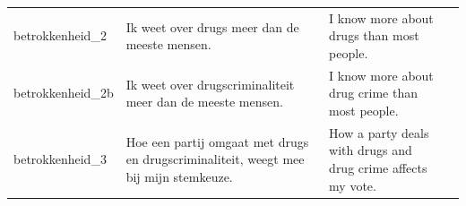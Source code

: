 \begin{table}[H]
\begin{tabularx}{\linewidth}{@{}l X X c@{}}
betrokkenheid\_2 & Ik weet over drugs meer dan de meeste mensen. & I know more about drugs than most people. & \\
betrokkenheid\_2b & Ik weet over drugscriminaliteit meer dan de meeste mensen. & I know more about drug crime than most people. & \\
betrokkenheid\_3 & Hoe een partij omgaat met drugs en drugscriminaliteit, weegt mee bij mijn stemkeuze. & How a party deals with drugs and drug crime affects my vote. & \\
\bottomrule
\end{tabularx}
\end{table}
